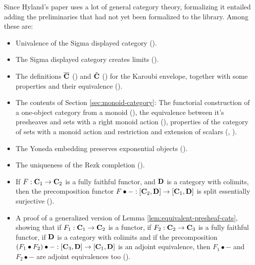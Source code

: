 Since Hyland's paper uses a lot of general category theory, formalizing it entailed adding the preliminaries that had not yet been formalized to the library. Among these are:
\begin{itemize}
  \item Univalence of the Sigma displayed category ().
  \item The Sigma displayed category creates limits ().
  \item The definitions $ \overline {\mathbf{C}} $ () and $ \tilde {\mathbf{C}} $ () for the Karoubi envelope, together with some properties and their equivalence ().
  \item The contents of Section \ref{sec:monoid-category}: The functorial construction of a one-object category from a monoid (), the equivalence between it's presheaves and sets with a right monoid action (), properties of the category of sets with a monoid action and restriction and extension of scalars (, ).
  \item The Yoneda embedding preserves exponential objects ().
  \item The uniqueness of the Rezk completion ().
  \item If $ F : \mathbf{C}_1 \to \mathbf{C}_2 $ is a fully faithful functor, and $ \mathbf{D} $ is a category with colimits, then the precomposition functor $ F \bullet - : [\mathbf{C}_2, \mathbf{D}] \to [\mathbf{C}_1, \mathbf{D}] $ is split essentially surjective ().
  \item A proof of a generalized version of Lemma \ref{lem:equivalent-presheaf-cats}, showing that if $ F_1 : \mathbf{C}_1 \to \mathbf{C}_2 $ is a functor, if $ F_2 : \mathbf{C}_2 \to \mathbf{C}_3 $ is a fully faithful functor, if $ \mathbf{D} $ is a category with colimits and if the precomposition $ (F_1 \bullet F_2) \bullet - : [\mathbf{C}_3, \mathbf{D}] \to [\mathbf{C}_1, \mathbf{D}] $ is an adjoint equivalence, then $ F_1 \bullet - $ and $ F_2 \bullet - $ are adjoint equivalences too ().

\end{itemize}
